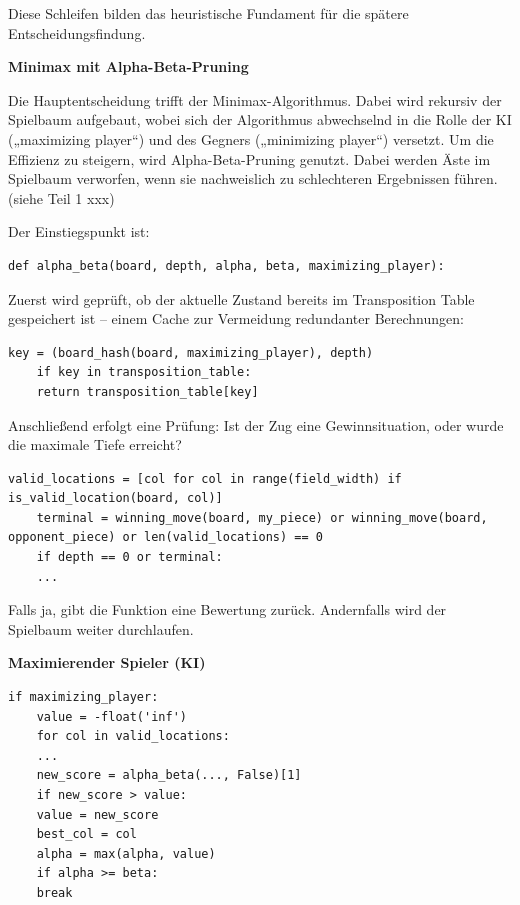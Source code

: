 Diese Schleifen bilden das heuristische Fundament für die spätere Entscheidungsfindung.

\textbf{Minimax mit Alpha-Beta-Pruning}

Die Hauptentscheidung trifft der Minimax-Algorithmus. Dabei wird rekursiv der Spielbaum aufgebaut, wobei sich der Algorithmus abwechselnd in die Rolle der KI („maximizing player“) und des Gegners („minimizing player“) versetzt. Um die Effizienz zu steigern, wird Alpha-Beta-Pruning genutzt. Dabei werden Äste im Spielbaum verworfen, wenn sie nachweislich zu schlechteren Ergebnissen führen. (siehe Teil 1 xxx)

Der Einstiegspunkt ist:

\begin{lstlisting}[style=pythonstyle]
	def alpha_beta(board, depth, alpha, beta, maximizing_player):
\end{lstlisting}

Zuerst wird geprüft, ob der aktuelle Zustand bereits im Transposition Table gespeichert ist – einem Cache zur Vermeidung redundanter Berechnungen:

\begin{lstlisting}[style=pythonstyle]
	key = (board_hash(board, maximizing_player), depth)
	if key in transposition_table:
	return transposition_table[key]
\end{lstlisting}

Anschließend erfolgt eine Prüfung: Ist der Zug eine Gewinnsituation, oder wurde die maximale Tiefe erreicht?

\begin{lstlisting}[style=pythonstyle]
	valid_locations = [col for col in range(field_width) if is_valid_location(board, col)]
	terminal = winning_move(board, my_piece) or winning_move(board, opponent_piece) or len(valid_locations) == 0
	if depth == 0 or terminal:
	...
\end{lstlisting}

Falls ja, gibt die Funktion eine Bewertung zurück. Andernfalls wird der Spielbaum weiter durchlaufen.

\textbf{Maximierender Spieler (KI)}

\begin{lstlisting}[style=pythonstyle]
	if maximizing_player:
	value = -float('inf')
	for col in valid_locations:
	...
	new_score = alpha_beta(..., False)[1]
	if new_score > value:
	value = new_score
	best_col = col
	alpha = max(alpha, value)
	if alpha >= beta:
	break
\end{lstlisting}

